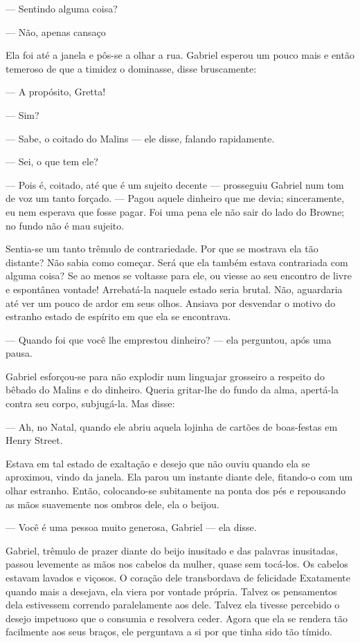 --- Sentindo alguma coisa?

--- Não, apenas cansaço

Ela foi até a janela e pôs-se a olhar a rua. Gabriel esperou um pouco
mais e então temeroso de que a timidez o dominasse, disse bruscamente:

--- A propósito, Gretta!

--- Sim?

--- Sabe, o coitado do Malins --- ele disse, falando rapidamente.

--- Sei, o que tem ele?

--- Pois é, coitado, até que é um sujeito decente --- prosseguiu
Gabriel num tom de voz um tanto forçado. --- Pagou aquele dinheiro que
me devia; sinceramente, eu nem esperava que fosse pagar. Foi uma pena
ele não sair do lado do Browne; no fundo não é mau sujeito.

Sentia-se um tanto trêmulo de contrariedade. Por que se mostrava ela
tão distante? Não sabia como começar. Será que ela
também estava contrariada com alguma coisa? Se ao menos se voltasse
para ele, ou viesse ao seu encontro de livre e espontânea vontade!
Arrebatá-la naquele estado seria brutal. Não, aguardaria até ver um
pouco de ardor em seus olhos. Ansiava por desvendar o motivo do
estranho estado de espírito em que ela se encontrava.

--- Quando foi que você lhe emprestou dinheiro? --- ela perguntou,
após uma pausa.

Gabriel esforçou-se para não explodir num linguajar grosseiro a
respeito do bêbado do Malins e do dinheiro. Queria gritar-lhe do
fundo da alma, apertá-la contra seu corpo, subjugá-la. Mas disse:

--- Ah, no Natal, quando ele abriu aquela lojinha de cartões de
boas-festas em Henry Street.

Estava em tal estado de exaltação e desejo que não ouviu quando ela se
aproximou, vindo da janela. Ela parou um instante diante dele,
fitando-o com um olhar estranho. Então, colocando-se subitamente na
ponta dos pés e repousando as mãos suavemente nos ombros dele, ela o
beijou.

--- Você é uma pessoa muito generosa, Gabriel --- ela disse.

Gabriel, trêmulo de prazer diante do beijo inusitado e das palavras
inusitadas, passou levemente as mãos nos cabelos da mulher, quase
sem tocá-los. Os cabelos estavam lavados e viçosos. O coração dele
transbordava de felicidade Exatamente quando mais a desejava, ela
viera por vontade própria. Talvez os pensamentos dela estivessem
correndo paralelamente aos dele. Talvez ela tivesse percebido o desejo
impetuoso que o consumia e resolvera ceder. Agora que ela se rendera
tão facilmente aos seus braços, ele perguntava a si por que tinha sido
tão tímido.

